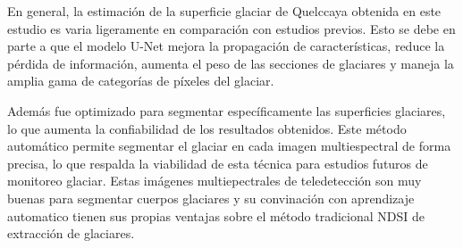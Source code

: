 En general, la estimación de la superficie glaciar de Quelccaya obtenida en este estudio es varia ligeramente en comparación con estudios previos. Esto se debe en parte a que el modelo U-Net mejora la propagación de características, reduce la pérdida de información, aumenta el peso de las secciones de glaciares y maneja la amplia gama de categorías de píxeles del glaciar. 

Además fue optimizado para segmentar específicamente las superficies glaciares, lo que aumenta la confiabilidad de los resultados obtenidos. Este método automático permite segmentar el glaciar en cada imagen multiespectral de forma precisa, lo que respalda la viabilidad de esta técnica para estudios futuros de monitoreo glaciar. Estas imágenes multiepectrales de teledetección son muy buenas para segmentar cuerpos glaciares y su convinación con aprendizaje automatico tienen sus propias ventajas sobre el método tradicional NDSI de extracción de glaciares.

\singlespacing

